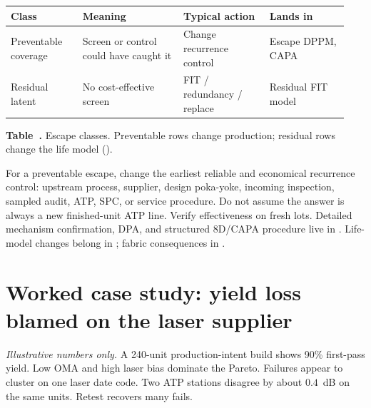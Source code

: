 \begin{table}[ht]
\label{tab:escape-classes}%
\centering
\setlength{\tabcolsep}{3.5pt}%
\footnotesize
\renewcommand{\arraystretch}{1.25}%
\begin{tabular}{@{}p{0.20\linewidth}p{0.28\linewidth}p{0.24\linewidth}p{0.22\linewidth}@{}}
\toprule
Class & Meaning & Typical action & Lands in \\
\midrule
Preventable coverage & Screen or control could have caught it & Change recurrence control & Escape DPPM, CAPA \\
\addlinespace[1.5em]
Residual latent & No cost-effective screen & FIT / redundancy / replace & Residual FIT model \\
\bottomrule
\end{tabular}
\par\medskip
{\raggedright\footnotesize\textbf{Table~\thetable.} Escape classes. Preventable
rows change production; residual rows change the life model
().\par}
\end{table}
\FloatBarrier

For a preventable escape, change the earliest reliable and economical
recurrence control: upstream process, supplier, design poka-yoke, incoming
inspection, sampled audit, ATP, SPC, or service procedure. Do not assume the
answer is always a new finished-unit ATP line. Verify effectiveness on fresh
lots. Detailed mechanism confirmation, DPA, and structured 8D/CAPA procedure
live in .
Life-model changes belong in ; fabric consequences in
.


\section{Worked case study: yield loss blamed on the laser supplier}
\label{sec:mfg-case-yield}

\textit{Illustrative numbers only.} A 240-unit production-intent build shows 90\%
first-pass yield. Low OMA and high laser bias dominate the
Pareto. Failures appear to cluster on one laser date code.
Two ATP stations disagree by about $0.4$~dB on the same units. Retest recovers
many fails.

